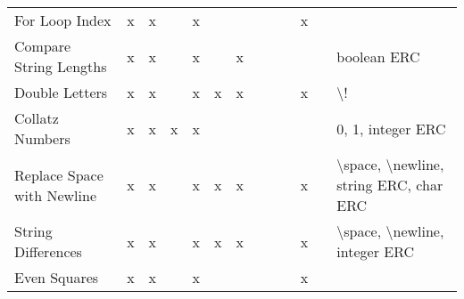 \documentclass{sig-alternate}
\begin{document}
\begin{table*}[h]
\begin{tabular}{|l|ccccccccccc|p{6cm}|}
For Loop Index             & x    & x       &       & x       &      &        &                    &                  &                   & x     &            &                                                                                                                                                                                                                             \\
Compare String Lengths     & x    & x       &       & x       &      & x      &                    &                  &                   &       &            & boolean ERC                                                                                                                                                                                                                 \\
Double Letters             & x    & x       &       & x       & x    & x      &                    &                  &                   & x     &            & \textbackslash !                                                                                                                                                                                                            \\
Collatz Numbers            & x    & x       & x     & x       &      &        &                    &                  &                   &       &            & 0, 1, integer ERC                                                                                                                                                                                                           \\
Replace Space with Newline & x    & x       &       & x       & x    & x      &                    &                  &                   & x     &            & \textbackslash space, \textbackslash newline, string ERC, char ERC                                                                                                                                                          \\
String Differences         & x    & x       &       & x       & x    & x      &                    &                  &                   & x     &            & \textbackslash space, \textbackslash newline, integer ERC                                                                                                                                                                   \\
Even Squares               & x    & x       &       & x       &      &        &                    &                  &                   & x     &            &                                                                                                                                                                                                                             \\

\end{tabular}
\end{table*}
\end{document}
